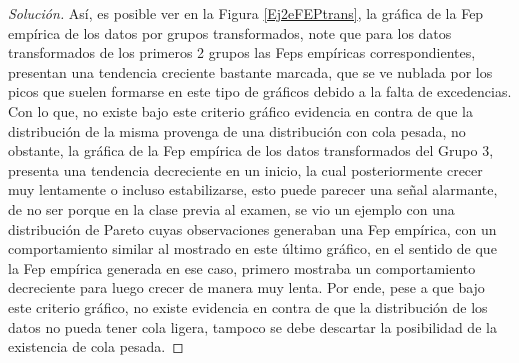 \documentclass[10.5pt,notitlepage]{article}
\newenvironment{solucion}
  {\begin{proof}[Solución]}
  {\end{proof}}
\theoremstyle{plain}
\begin{document}
\begin{solucion}
Así, es posible ver en la Figura \ref{Ej2eFEPtrans}, la gráfica de la Fep empírica de los datos por grupos transformados, note que para los datos transformados de los primeros 2 grupos las Feps empíricas correspondientes, presentan una tendencia creciente bastante marcada, que se ve nublada por los picos que suelen formarse en este tipo de gráficos debido a la falta de excedencias. Con lo que, no existe bajo este criterio gráfico evidencia en contra de que la distribución de la misma provenga de una distribución con cola pesada, no obstante, la gráfica de la Fep empírica de los datos transformados del Grupo 3, presenta una tendencia decreciente en un inicio, la cual posteriormente crecer muy lentamente o incluso estabilizarse, esto puede parecer una señal alarmante, de no ser porque en la clase previa al examen, se vio un ejemplo con una distribución de Pareto cuyas observaciones generaban una Fep empírica, con un comportamiento similar al mostrado en este último gráfico, en el sentido de que la Fep empírica generada en ese caso, primero mostraba un comportamiento decreciente para luego crecer de manera muy lenta. Por ende, pese a que bajo este criterio gráfico, no existe evidencia en contra de que la distribución de los datos no pueda tener cola ligera, tampoco se debe descartar la posibilidad de la existencia de cola pesada.  


\end{solucion}
\end{document}
